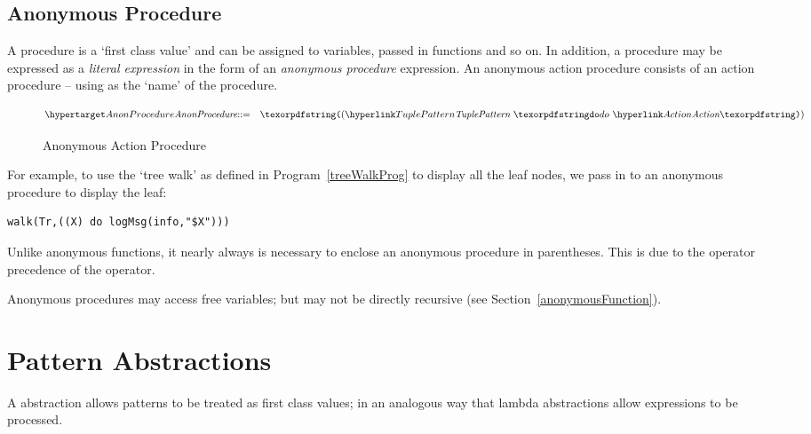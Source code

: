 \begin{prooftree}
\end{prooftree}


\subsection{Anonymous Procedure}
\label{anonymousAction}

A procedure is a `first class value' and can be assigned to variables, passed in functions and so on. In addition, a procedure may be expressed as a \emph{literal expression} in the form of an \emph{anonymous procedure} expression. An anonymous action procedure consists of an action procedure -- using  as the `name' of the procedure.

\begin{figure}[htbp]
\begin{eqnarray*}
\ntDef{AnonProcedure}&\arrow&\q{(}\ntRef{TuplePattern}\ \q{do}\ \ntRef{Action}\q{)}
\end{eqnarray*}
\caption{Anonymous Action Procedure}
\label{anonymousProcedureFig}
\end{figure}

For example, to use the `tree walk' as defined in Program~\vref{treeWalkProg} to display all the leaf nodes, we pass in to  an anonymous procedure to display the leaf:
\begin{lstlisting}
walk(Tr,((X) do logMsg(info,"$X")))
\end{lstlisting}

\begin{aside}
Unlike anonymous functions, it nearly always is necessary to enclose an anonymous procedure in parentheses. This is due to the operator precedence of the  operator.
\end{aside}

Anonymous procedures may access free variables; but may not be directly recursive (see Section~\vref{anonymousFunction}).


\section{Pattern Abstractions}
\label{tauPattern}
A  abstraction allows patterns to be treated as first class values; in an analogous way that lambda abstractions allow expressions to be processed.

